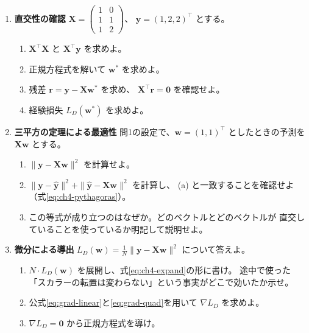 \begin{enumerate}

  \item \textbf{直交性の確認}\quad
    $\bm{X} = \begin{pmatrix} 1 & 0 \\ 1 & 1 \\ 1 & 2 \end{pmatrix}$、
    $\bm{y} = (1, 2, 2)^\top$ とする。
    \begin{enumerate}
      \item $\bm{X}^\top\bm{X}$ と $\bm{X}^\top\bm{y}$ を求めよ。
      \item 正規方程式を解いて $\bm{w}^*$ を求めよ。
      \item 残差 $\bm{r} = \bm{y} - \bm{X}\bm{w}^*$ を求め、
        $\bm{X}^\top\bm{r} = \bm{0}$ を確認せよ。
      \item 経験損失 $L_D(\bm{w}^*)$ を求めよ。
    \end{enumerate}

  \item \textbf{三平方の定理による最適性}\quad
    問1の設定で、$\bm{w} = (1, 1)^\top$ としたときの予測を $\bm{X}\bm{w}$ とする。
    \begin{enumerate}
      \item $\|\bm{y} - \bm{X}\bm{w}\|^2$ を計算せよ。
      \item $\|\bm{y} - \hat{\bm{y}}\|^2 + \|\hat{\bm{y}} - \bm{X}\bm{w}\|^2$ を計算し、
        (a) と一致することを確認せよ（式\eqref{eq:ch4-pythagoras}）。
      \item この等式が成り立つのはなぜか。どのベクトルとどのベクトルが
        直交していることを使っているか明記して説明せよ。
    \end{enumerate}

  \item \textbf{微分による導出}\quad
    $L_D(\bm{w}) = \frac{1}{N}\|\bm{y} - \bm{X}\bm{w}\|^2$ について答えよ。
    \begin{enumerate}
      \item $N \cdot L_D(\bm{w})$ を展開し、式\eqref{eq:ch4-expand}の形に書け。
        途中で使った「スカラーの転置は変わらない」という事実がどこで効いたか示せ。
      \item 公式\eqref{eq:grad-linear}と\eqref{eq:grad-quad}を用いて $\nabla L_D$ を求めよ。
      \item $\nabla L_D = \bm{0}$ から正規方程式を導け。
    \end{enumerate}


\end{enumerate}
